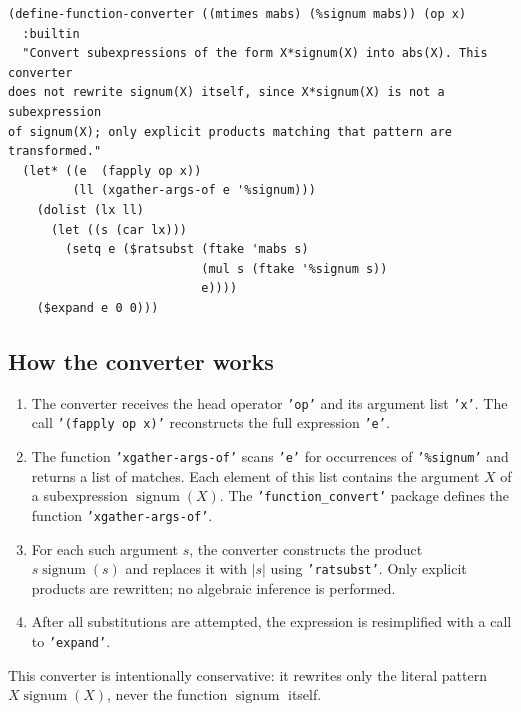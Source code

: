 \documentclass[12pt,fleqn]{extarticle}
\newcommand{\ttq}[1]{\texttt{'#1'}}
\newcommand{\funconvert}{\ttq{function\_convert}{ }}
\newenvironment{maximabox}
  {\begin{tcolorbox}[
      breakable,
      enhanced,
      colback=white,
      colframe=black!8,
      boxrule=0pt,
      borderline west={2.2pt}{0pt}{black!25},
      arc=1pt,
      left=11pt,
      right=7pt,
      top=9pt,
      bottom=9pt,
      before skip=14pt,
      after skip=14pt
    ]}
  {\end{tcolorbox}}
\DeclareMathOperator{\signum}{signum}
\begin{document}
\begin{maximabox}
\begin{verbatim}
(define-function-converter ((mtimes mabs) (%signum mabs)) (op x)
  :builtin
  "Convert subexpressions of the form X*signum(X) into abs(X). This converter
does not rewrite signum(X) itself, since X*signum(X) is not a subexpression
of signum(X); only explicit products matching that pattern are transformed."
  (let* ((e  (fapply op x))
         (ll (xgather-args-of e '%signum)))
    (dolist (lx ll)
      (let ((s (car lx)))
        (setq e ($ratsubst (ftake 'mabs s)
                           (mul s (ftake '%signum s))
                           e))))
    ($expand e 0 0)))
\end{verbatim}
\end{maximabox}

\subsection*{How the converter works}

\begin{enumerate}[label=(\alph*), noitemsep, topsep=0pt]
  \item The converter receives the head operator \ttq{op} and its
        argument list \ttq{x}.  The call \ttq{(fapply op x)}
        reconstructs the full expression  \ttq{e}.

  \item The function \ttq{xgather-args-of} scans \ttq{e}  for
        occurrences of \ttq{\%signum} and returns a list of matches.
        Each element of this list contains the argument \(X\) of a
        subexpression \(\signum(X)\). The \funconvert
        package defines the function \ttq{xgather-args-of}.

  \item For each such argument \(s\), the converter constructs the
        product \(s  \signum(s)\) and replaces it with
        \(|s|\) using \ttq{ratsubst}.  Only explicit
        products are rewritten; no algebraic inference is performed.

  \item After all substitutions are attempted, the expression is resimplified with a
        call to \ttq{expand}.
\end{enumerate}

This converter is intentionally conservative: it rewrites only the
literal pattern \(X  \signum(X)\), never the function
\(\signum\) itself.

\end{document}
